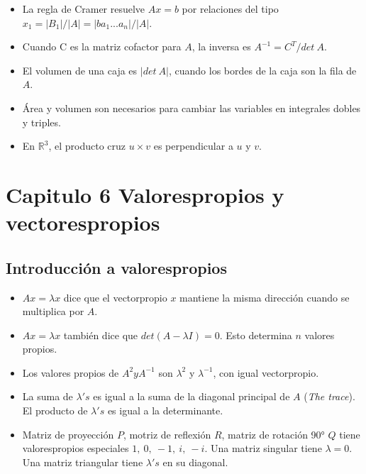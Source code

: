 \documentclass[]{article}
\begin{document}
\begin{itemize}
	
	\item La regla de Cramer resuelve $ Ax=b $ por relaciones del tipo $ x_{1}=|B_{1}|/|A|=|ba_{1}...a_{n}|/|A| $.
	
	\item Cuando C es la matriz cofactor para $ A $, la inversa es $ A^{-1}=C^{T}/det\ A $.
	
	\item El volumen de una caja es $ |det\ A| $, cuando los bordes de la caja son la fila de $ A $.
	
	\item \'Area y volumen son necesarios para cambiar las variables en integrales dobles y triples.
	
	\item En $ \mathbb{R}^{3} $, el producto cruz $ u \times v $ es perpendicular a $ u $ y $ v $. 
	
\end{itemize}

\section{Capitulo 6 Valorespropios y vectorespropios}

\subsection{Introducci\'on a valorespropios}

\begin{itemize}
	\item $ Ax=\lambda x $ dice que el vectorpropio $ x $ mantiene la misma direcci\'on cuando se multiplica por $ A $. 
	
	\item $ Ax=\lambda x $ tambi\'en dice que $ det(A-\lambda I)=0 $. Esto determina $ n $ valores propios. 
	
	\item Los valores propios de $ A^{2} y A^{-1} $ son $ \lambda^{2} $ y $ \lambda^{-1} $, con igual vectorpropio. 
	
	\item La suma de $ \lambda's $ es igual a la suma de la diagonal principal de $ A $ (\textit{The trace}). El producto de $ \lambda's $ es igual a la determinante. 
	
	\item Matriz de proyecci\'on $ P $, motriz de reflexi\'on $ R $, matriz de rotaci\'on 90° $ Q $ tiene valorespropios especiales $ 1,\ 0,\ -1,\ i,\ -i $. Una matriz singular tiene $ \lambda=0 $. Una matriz triangular tiene $ \lambda's $ en su diagonal. 
	
\end{itemize}
\end{document}
